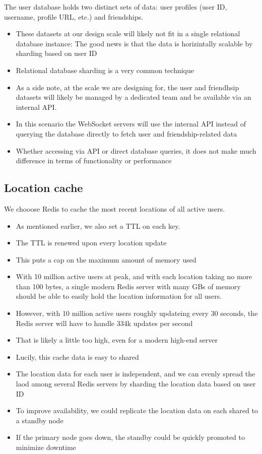 \documentclass{report}
\theoremstyle{definition}
\let\oldsubsection\subsection
\renewcommand{\subsection}{\oldsubsection*}
\begin{document}
The user database holds two distinct sets of data: user profiles (user ID, username, profile URL, etc.) and friendships.

\begin{itemize}
\item
These datasets at our design scale will likely not fit in a single relational database instance: The good news is that the data is horizintally scalable by sharding based on user ID
\item
Relational database sharding is a very common technique
\item
As a side note, at the scale we are designing for, the user and friendhsip datasets will likely be managed by a dedicated team and be
available via an internal API.
\item
In this scenario the WebSocket servers will use the internal API instead of querying the database directly to fetch user and friendship-related data
\item
Whether accessing via API or direct database queries, it does not make much difference in terms of functionality or performance
\end{itemize}

\subsection{Location cache}

We chooose Redis to cache the most recent locations of all active users.

\begin{itemize}
\item
As mentioned earlier, we also set a TTL on each key.
\item
The TTL is renewed upon every location update
\item
This puts a cap on the maximum amount of memory used
\item
With 10 million active users at peak, and with each location taking no more than 100 bytes, a single modern Redis server with many GBs
of memory should be able to easily hold the location information for all users.
\item
However, with 10 million active users roughly updateing every 30 seconds, the Redis server will have to handle 334k updates per second
\item
That is likely a little too high, even for a modern high-end server
\item
Lucily, this cache data is easy to shared
\item
The location data for each user is independent, and we can evenly spread the laod among several Redis servers by sharding the location data based on user ID
\item
To improve availability, we could replicate the location data on each shared to a standby node
\item
If the primary node goes down, the standby could be quickly promoted to minimize downtime
\end{itemize}
\end{document}
